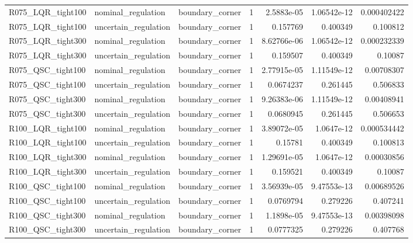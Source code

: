 \begin{tabular}{llllrrr}
R075\_LQR\_tight100 & nominal\_regulation & boundary\_corner & 1 & 2.5883e-05 & 1.06542e-12 & 0.000402422 \\
R075\_LQR\_tight100 & uncertain\_regulation & boundary\_corner & 1 & 0.157769 & 0.400349 & 0.100812 \\
R075\_LQR\_tight300 & nominal\_regulation & boundary\_corner & 1 & 8.62766e-06 & 1.06542e-12 & 0.000232339 \\
R075\_LQR\_tight300 & uncertain\_regulation & boundary\_corner & 1 & 0.159507 & 0.400349 & 0.10087 \\
R075\_QSC\_tight100 & nominal\_regulation & boundary\_corner & 1 & 2.77915e-05 & 1.11549e-12 & 0.00708307 \\
R075\_QSC\_tight100 & uncertain\_regulation & boundary\_corner & 1 & 0.0674237 & 0.261445 & 0.506833 \\
R075\_QSC\_tight300 & nominal\_regulation & boundary\_corner & 1 & 9.26383e-06 & 1.11549e-12 & 0.00408941 \\
R075\_QSC\_tight300 & uncertain\_regulation & boundary\_corner & 1 & 0.0680945 & 0.261445 & 0.506653 \\
R100\_LQR\_tight100 & nominal\_regulation & boundary\_corner & 1 & 3.89072e-05 & 1.0647e-12 & 0.000534442 \\
R100\_LQR\_tight100 & uncertain\_regulation & boundary\_corner & 1 & 0.15781 & 0.400349 & 0.100813 \\
R100\_LQR\_tight300 & nominal\_regulation & boundary\_corner & 1 & 1.29691e-05 & 1.0647e-12 & 0.00030856 \\
R100\_LQR\_tight300 & uncertain\_regulation & boundary\_corner & 1 & 0.159521 & 0.400349 & 0.10087 \\
R100\_QSC\_tight100 & nominal\_regulation & boundary\_corner & 1 & 3.56939e-05 & 9.47553e-13 & 0.00689526 \\
R100\_QSC\_tight100 & uncertain\_regulation & boundary\_corner & 1 & 0.0769794 & 0.279226 & 0.407241 \\
R100\_QSC\_tight300 & nominal\_regulation & boundary\_corner & 1 & 1.1898e-05 & 9.47553e-13 & 0.00398098 \\
R100\_QSC\_tight300 & uncertain\_regulation & boundary\_corner & 1 & 0.0777325 & 0.279226 & 0.407768 \\
\hline
\end{tabular}
